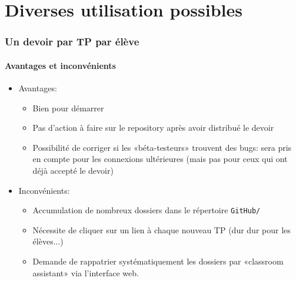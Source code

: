 \section{Diverses utilisation possibles}


\begin{frame}
	\frametitle{Un devoir par TP par élève}
	\framesubtitle{Avantages et inconvénients}

	\begin{itemize}[<+->]
		\item Avantages:
			\begin{itemize}[<+->]
					\item Bien pour démarrer

					\item Pas d'action à faire sur le repository après avoir distribué le devoir

					\item Possibilité de corriger si les «béta-testeurs» trouvent des bugs: sera pris en compte pour les connexions ultérieures (mais pas pour ceux qui ont déjà accepté le devoir)
			\end{itemize}
		\item Inconvénients:
			\begin{itemize}[<+->]
					\item Accumulation de nombreux dossiers dans le répertoire \texttt{GitHub/}

					\item Nécessite de cliquer sur un lien à chaque nouveau TP (dur dur pour les élèves...)

					\item Demande de rappatrier systématiquement les dossiers par «classroom assistant» via l'interface web.
			\end{itemize}
	\end{itemize}

\end{frame}


